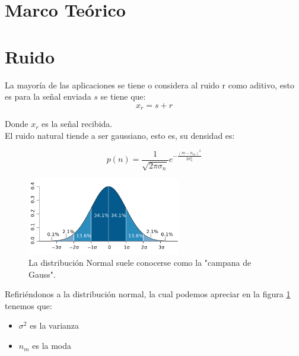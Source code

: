 \documentclass{article}
\author{Pablo Vivar Colina}
\begin{document}
\tableofcontents  %

\listoffigures  %


\section{Marco Teórico}

\section{Ruido}

La mayoría de las aplicaciones se tiene o considera al ruido r como aditivo, esto es para la señal enviada $s$ se tiene que:\citep{Capitulo1SC}\\

\begin{equation}
    x_r=s+r
\end{equation}

Donde $x_r$ es la señal recibida.\citep{Capitulo1SC}\\

El ruido natural tiende a ser gaussiano, esto es, su densidad es:\citep{Capitulo1SC}

\begin{equation}
    p(n)=\frac{1}{\sqrt{2 \pi \sigma_n}} e^{-\frac{(m-n_m)^2}{2 \sigma_n^2}}
\end{equation}

\begin{figure}[h!]
    \centering
    
   
\includegraphics[width=0.6\textwidth]{Imagenes/Standard_deviation_diagram.png}
\caption{ La distribución Normal suele conocerse como la "campana de Gauss".}
    \label{fig:distNorm}
 
\end{figure}


Refiriéndonos a la distribución normal, la cual podemos apreciar en la figura \ref{fig:distNorm} tenemos que:\citep{DistribucionNormal}\\

\begin{itemize}
    \item $\sigma^2$ es la varianza
    \item $n_m$ es la moda
\end{itemize}
\end{document}
